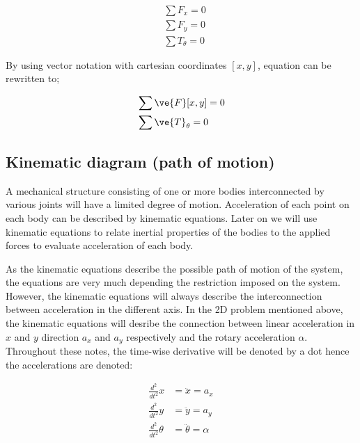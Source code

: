 \begin{subequations} \label{eqn:static1}
	\begin{align}
	&\sum{F_x} = 0 \\
	&\sum{F_y} = 0 \\
	&\sum{T_{\theta}}  = 0
	\end{align}
\end{subequations}

\par By using vector notation with cartesian coordinates $[x,y ] $, equation  can be rewritten to;

\begin{subequations}
 	\begin{align}
 	 &\sum{\ve{F}[x,y]} = 0 \\
 	 &\sum{\ve{T}_{\theta}} = 0 
 	\end{align}
\end{subequations}


\subsection{Kinematic diagram (path of motion)}
\par A mechanical structure consisting of one or more bodies interconnected by various joints will have a limited
	degree of motion. Acceleration of each point on each body can be described by kinematic equations. Later on 
	we will use kinematic equations to relate inertial properties of the bodies to the applied forces to evaluate
	acceleration of each body.
\par As the kinematic equations describe the possible path of motion of the system, the equations are very much 
	depending the restriction imposed on the system. However, the kinematic equations will always describe the 
	interconnection between acceleration in the different axis. In the 2D problem mentioned above, the kinematic
	equations will desribe the connection between linear acceleration in $x$ and $y$ direction $a_x$ and $a_y$ 
 	respectively and the rotary
	acceleration $\alpha$. Throughout these notes, the time-wise derivative will be denoted by a dot hence the accelerations
	are denoted:
	
\begin{subequations}
 	\begin{align}
 	 \frac{d^2}{dt^2}x &= \ddot{x}  = a_x\\
 	 \frac{d^2}{dt^2}y &= \ddot{y}  = a_y\\
 	 \frac{d^2}{dt^2}\theta &= \ddot{\theta} = \alpha
 	\end{align}
\end{subequations}

